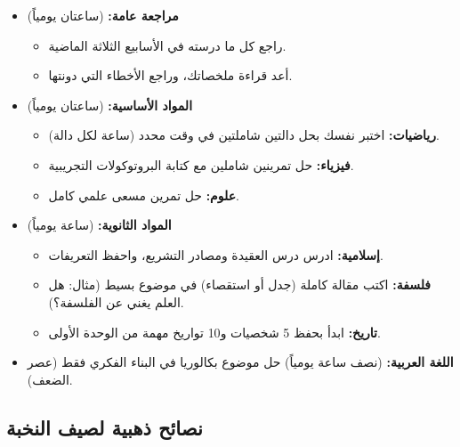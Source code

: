 \documentclass[12pt,a4paper]{book}
\begin{document}
	\begin{itemize}
		\item \textbf{مراجعة عامة:} (ساعتان يومياً)
		\begin{itemize}
			\item راجع كل ما درسته في الأسابيع الثلاثة الماضية.
			\item أعد قراءة ملخصاتك، وراجع الأخطاء التي دونتها.
		\end{itemize}
		\item \textbf{المواد الأساسية:} (ساعتان يومياً)
		\begin{itemize}
			\item \textbf{رياضيات:} اختبر نفسك بحل دالتين شاملتين في وقت محدد (ساعة لكل دالة).
			\item \textbf{فيزياء:} حل تمرينين شاملين مع كتابة البروتوكولات التجريبية.
			\item \textbf{علوم:} حل تمرين مسعى علمي كامل.
		\end{itemize}
		\item \textbf{المواد الثانوية:} (ساعة يومياً)
		\begin{itemize}
			\item \textbf{إسلامية:} ادرس درس العقيدة ومصادر التشريع، واحفظ التعريفات.
			\item \textbf{فلسفة:} اكتب مقالة كاملة (جدل أو استقصاء) في موضوع بسيط (مثال: هل العلم يغني عن الفلسفة؟).
			\item \textbf{تاريخ:} ابدأ بحفظ 5 شخصيات و10 تواريخ مهمة من الوحدة الأولى.
		\end{itemize}
		\item \textbf{اللغة العربية:} (نصف ساعة يومياً) حل موضوع بكالوريا في البناء الفكري فقط (عصر الضعف).
	\end{itemize}
	
	\subsection{نصائح ذهبية لصيف النخبة}
	\label{sec:random-tips}
	
\end{document}
